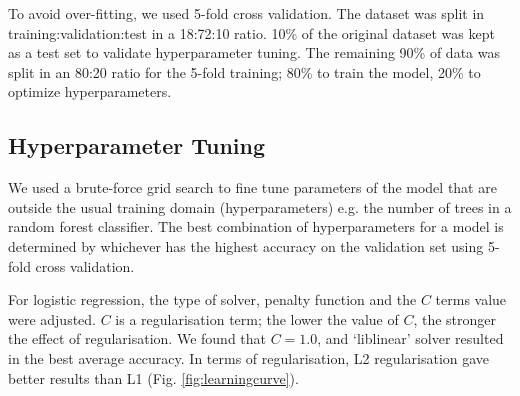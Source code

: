 To avoid over-fitting, we used 5-fold cross validation. The  dataset was split in training:validation:test in a 18:72:10 ratio. 10\% of the original dataset was kept as a test set to validate hyperparameter tuning. The remaining 90\% of data was split in an 80:20 ratio for the 5-fold training; 80\% to train the model,  20\% to optimize hyperparameters. %

\subsection{Hyperparameter Tuning} \label{hpt}
We used a brute-force grid search to fine tune parameters of the model that are outside the usual training domain (hyperparameters) e.g. the number of trees in a random forest classifier.
The best combination of hyperparameters for a model is determined by whichever has the highest accuracy on the validation set using 5-fold cross validation.

For logistic regression, the type of solver, penalty function and the $C$  terms value were adjusted. $C$ is a regularisation term; 
the lower the value of $C$, the stronger the effect of regularisation. We found that  $C=1.0$, and `liblinear' solver resulted in the best average accuracy. In terms of regularisation, L2 regularisation gave better results than L1 (Fig. \ref{fig:learningcurve}).

